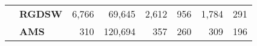 \begin{table}[H]
\begin{tabular}{llrrrrrr}
\cline{2-8}
\bfseries  & \bfseries RGDSW & 6,766 & {\cellcolor[HTML]{E2E4FB}} \color[HTML]{000000} 69,645 & {\cellcolor[HTML]{405FE5}} \color[HTML]{F1F1F1} 2,612 & {\cellcolor[HTML]{ACB8F4}} \color[HTML]{000000} 956 & {\cellcolor[HTML]{768BEC}} \color[HTML]{F1F1F1} 1,784 & 291 \\
\cline{2-8}
\bfseries  & \bfseries AMS & 310 & {\cellcolor[HTML]{E2E4FB}} \color[HTML]{000000} 120,694 & {\cellcolor[HTML]{768BEC}} \color[HTML]{F1F1F1} 357 & {\cellcolor[HTML]{ACB8F4}} \color[HTML]{000000} 260 & {\cellcolor[HTML]{405FE5}} \color[HTML]{F1F1F1} 309 & 196 \\
\cline{1-8} \cline{2-8}
\bottomrule
\end{tabular}
\end{table}
